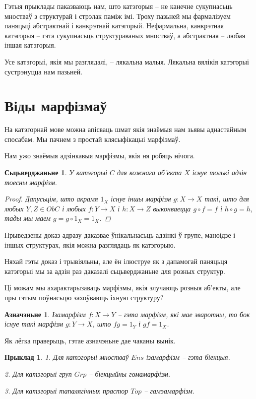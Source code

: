 \documentclass[a4paper,12pt]{book}
\newtheorem{claim}{Сьцьверджаньне}[section]
\newtheorem{example}{Прыклад}[section]
\newtheorem{definition}{Азначэньне}[section]
\begin{document}
Гэтыя прыклады паказваюць нам, што катэгорыя -- не канечне сукупнасьць
мностваў з структурай і стрэлак паміж імі. Троху пазьней мы
фармалізуем паняцьці абстрактнай і канкрэтнай катэгорый. Нефармальна,
канкрэтная катэгорыя -- гэта сукупнасьць структураваных мностваў, а
абстрактная -- любая іншая катэгорыя.

Усе катэгорыі, якія мы разглядалі, -- лякальна малыя. Лякальна вялікія
катэгорыі сустрэнуцца нам пазьней.

\section{Віды марфізмаў}

На катэгорнай мове можна апісваць шмат якія знаёмыя нам зьявы
аднастайным спосабам. Мы пачнем з простай клясыфікацыі марфізмаў.

Нам ужо знаёмыя адзінкавыя марфізмы, якія ня робяць нічога.

\begin{claim}
  У катэгорыі $C$ для кожнага аб'екта $X$ існуе толькі адзін тоесны
  марфізм.
  \begin{proof}
    Дапусьцім, што акрамя $1_X$ існуе іншы марфізм $g: X \rightarrow X$
    такі, што для любых $Y, Z \in ObC$ і любых $f:Y \rightarrow X$ і
    $h:X \rightarrow Z$ выконваецца $g \circ f = f$ і $h \circ g = h$,
    тады мы маем $g = g \circ 1_X = 1_X$.
  \end{proof}
\end{claim}

Прыведзены доказ адразу даказвае ўнікальнасьць адзінкі ў групе,
маноідзе і іншых структурах, якія можна разглядаць як катэгорыю.

Няхай гэты доказ і трывіяльны, але ён ілюструе як з дапамогай паняцьця
катэгорыі мы за адзін раз даказалі сьцьверджаньне для розных
структур.

Ці можам мы ахарактарызаваць марфізмы, якія злучаюць розныя аб'екты,
але пры гэтым поўнасьцю захоўваюць іхную структуру?

\begin{definition}
  Ізамарфізм $f: X \rightarrow Y$ -- гэта марфізм, які мае зваротны,
  то бок існуе такі марфізм $g: Y \rightarrow X$, што $fg = 1_Y$ і $gf
  = 1_X$.
\end{definition}

Як лёгка праверыць, гэтае азначэньне дае чаканы вынік.

\begin{example}
  1. Для катэгорыі мностваў $Ens$ ізамарфізм -- гэта біекцыя.

  2. Для катэгорыі груп $Grp$ -- біекцыйны гомамарфізм.

  3. Для катэгорыі тапалягічных прастор $Top$ -- гамэамарфізм.
\end{example}
\end{document}
